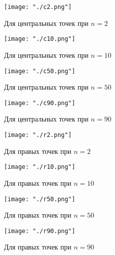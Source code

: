 \documentclass[a5paper, 10pt]{article}
\theoremstyle{definition}
\theoremstyle{plain}
\theoremstyle{remark}
\begin{document}
\begin{figure}[h]
		\begin{center}
                      \texttt{[image: "./c2.png"]}
	           \caption{Для центральных точек при $n=2$}
		\end{center}
	\end{figure}
\begin{figure}
		\begin{center}
                      \texttt{[image: "./c10.png"]}
	           \caption{Для центральных точек при $n=10$}
		\end{center}
	\end{figure}
\begin{figure}
		\begin{center}
                      \texttt{[image: "./с50.png"]}
	           \caption{Для центральных точек при $n=50$}
		\end{center}
	\end{figure}
\begin{figure}
		\begin{center}
                      \texttt{[image: "./с90.png"]}
	           \caption{Для центральных точек при $n=90$}
		\end{center}
	\end{figure}
\begin{figure}
		\begin{center}
                      \texttt{[image: "./r2.png"]}
	           \caption{Для правых точек при $n=2$}
		\end{center}
	\end{figure}
\begin{figure}
		\begin{center}
                      \texttt{[image: "./r10.png"]}
	           \caption{Для правых точек при $n=10$}
		\end{center}
	\end{figure}
\begin{figure}
		\begin{center}
                      \texttt{[image: "./r50.png"]}
	           \caption{Для правых точек при $n=50$}
		\end{center}
	\end{figure}
\begin{figure}
		\begin{center}
                      \texttt{[image: "./r90.png"]}
	           \caption{Для правых точек при $n=90$}
		\end{center}
	\end{figure}
\end{document}
